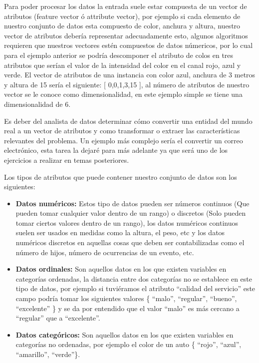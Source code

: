 \documentclass[11pt,fleqn]{book} %
\begin{document}
Para poder procesar los datos la entrada suele estar compuesta de un vector de atributos (feature vector ó attribute vector), por ejemplo si cada elemento de nuestro conjunto de datos esta compuesto de color, anchura y altura, nuestro vector de atributos debería representar adecuadamente esto, algunos algoritmos requieren que nuestros vectores estén compuestos de datos númericos, por lo cual para el ejemplo anterior se podría descomponer el atributo de colos en tres atributos que serían el valor de la intensidad del color en el canal rojo, azul y verde. El vector de atributos de una instancia con color azul, anchura de 3 metros y altura de 15 sería el siguiente: [ 0,0,1,3,15 ], al número de atributos de nuestro vector se le conoce como dimensionalidad, en este ejemplo simple se tiene una dimensionalidad de 6.

Es deber del analista de datos determinar cómo convertir una entidad del mundo real a un vector de atributos y como transformar o extraer las características relevantes del problema. Un ejemplo más complejo sería el convertir un correo electrónico, esta tarea la dejaré para más adelante ya que será uno de los ejercicios a realizar en temas posteriores.

Los tipos de atributos que puede contener nuestro conjunto de datos son los siguientes:
\begin{itemize}
\item \textbf{Datos numéricos:} Estos tipo de datos pueden ser números continuos (Que pueden tomar cualquier valor dentro de un rango) o discretos (Solo pueden tomar ciertos valores dentro de un rango), los datos numéricos continuos suelen ser usados en medidas como la altura, el peso, etc y los datos numéricos discretos en aquellas cosas que deben ser contabilizadas como el número de hijos, número de ocurrencias de un evento, etc.
\item \textbf{Datos ordinales:} Son aquellos datos en los que existen variables en categorías ordenadas, la distancia entre dos categorías no se establece en este tipo de datos, por ejemplo si tuviéramos el atributo ``calidad del servicio'' este campo podría tomar los siguientes valores \{  ``malo'', ``regular'', ``bueno'', ``excelente'' \} y se da por entendido que el valor ``malo'' es más cercano a ``regular'' que a ``excelente''.
\item \textbf{Datos categóricos:} Son aquellos datos en los que existen variables en categorías no ordenadas, por ejemplo el color de un auto \{ ``rojo'', ``azul'', ``amarillo'', ``verde''\}.
\end{itemize}
\end{document}
